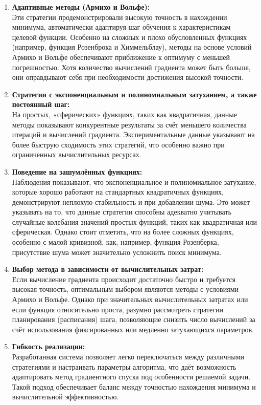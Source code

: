 \documentclass{article}
\begin{document}
\begin{enumerate}
    \item \textbf{Адаптивные методы (Армихо и Вольфе):} \\
    Эти стратегии продемонстрировали высокую точность в нахождении минимума, автоматически адаптируя шаг обучения к характеристикам целевой функции. Особенно на сложных и плохо обусловленных функциях (например, функция Розенброка и Химмельблау), методы на основе условий Армихо и Вольфе обеспечивают приближение к оптимуму с меньшей погрешностью. Хотя количество вычислений градиента может быть больше, они оправдывают себя при необходимости достижения высокой точности.

    \item \textbf{Стратегии с экспоненциальным и полиномиальным затуханием, а также постоянный шаг:} \\
    На простых, «сферических» функциях, таких как квадратичная, данные методы показывают конкурентные результаты за счёт меньшего количества итераций и вычислений градиента. Экспериментальные данные указывают на более быструю сходимость этих стратегий, что особенно важно при ограниченных вычислительных ресурсах.

    \item \textbf{Поведение на зашумлённых функциях:} \\
    Наблюдения показывают, что экспоненциальное и полиномиальное затухание, которые хорошо работают на стандартных квадратичных функциях, демонстрируют неплохую стабильность и при добавлении шума. Это может указывать на то, что данные стратегии способны адекватно учитывать случайные колебания значений простых функций, таких как квадратичная или сферическая. Однако стоит отметить, что на более сложных функциях, особенно с малой кривизной, как, например, функция Розенберка, присутствие шума может значительно усложнить поиск минимума.

    \item \textbf{Выбор метода в зависимости от вычислительных затрат:} \\
    Если вычисление градиента происходит достаточно быстро и требуется высокая точность, оптимальным выбором являются методы с условиями Армихо и Вольфе. Однако при значительных вычислительных затратах или если функция относительно проста, разумно рассмотреть стратегии планирования (расписания) шага, позволяющие снизить число вычислений за счёт использования фиксированных или медленно затухающихся параметров.

    \item \textbf{Гибкость реализации:} \\
    Разработанная система позволяет легко переключаться между различными стратегиями и настраивать параметры алгоритма, что даёт возможность адаптировать метод градиентного спуска под особенности решаемой задачи. Такой подход обеспечивает баланс между точностью нахождения минимума и вычислительной эффективностью.
\end{enumerate}
\end{document}
